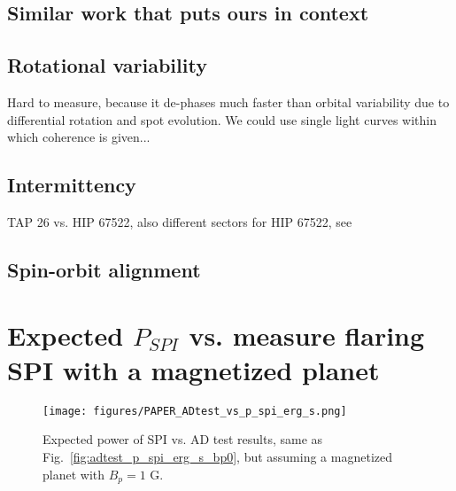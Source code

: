 \documentclass[twocolumn]{aastex631}
\begin{document}
\subsection{Similar work that puts ours in context}

\subsection{Rotational variability}
Hard to measure, because it de-phases much faster than orbital variability due to differential rotation and spot evolution. We could use single light curves within which coherence is given...

\subsection{Intermittency}

TAP 26 vs. HIP 67522, also different sectors for HIP 67522, see \cite{shkolnik2008nature}

\subsection{Spin-orbit alignment}



\appendix
\section{Expected $P_{SPI}$ vs. measure flaring SPI with a magnetized planet}

\begin{figure*}[ht!]
    \begin{centering}
        \texttt{[image: figures/PAPER\_ADtest\_vs\_p\_spi\_erg\_s.png]}
        \caption{
            Expected power of SPI vs. AD test results, same as Fig.~\ref{fig:adtest_p_spi_erg_s_bp0}, but assuming a magnetized planet with $B_p=1$ G. 
        }
        \label{appendix:fig:adtest_p_spi_erg_s}
    \end{centering}
\end{figure*}
\end{document}

